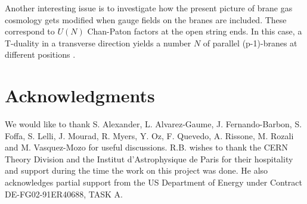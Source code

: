 \documentclass[a4paper,twocolumn,nofootinbib,tightenlines,prd,aps,
               superscriptaddress]{revtex4} %
\begin{document}
Another interesting issue is to investigate how the present
picture of brane gas cosmology gets modified when gauge fields on
the branes are included. These correspond to $U(N)$ Chan-Paton
factors at the open string ends. In this case, a T-duality in a
transverse direction yields a number $N$ of parallel (p-1)-branes
at different positions \cite{Polchinski:1998rq}.




\section*{Acknowledgments}

We would like to thank S. Alexander, L. Alvarez-Gaume, J.
 Fernando-Barbon, S. Foffa, S. Lelli, J. Mourad, R. Myers, Y. Oz, F. Quevedo,
A. Rissone, M. Rozali and M. Vasquez-Mozo  for useful discussions. R.B.
wishes to thank the CERN Theory Division and the Institut
d'Astrophysique de Paris for their hospitality and support during
the time the work on this project was done.  He also acknowledges
partial support from the US Department of Energy under Contract
DE-FG02-91ER40688, TASK A.


%
%
\end{document}
